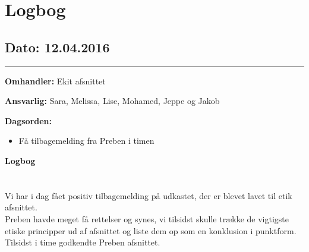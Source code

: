 \chapter{Logbog}

\section{Dato: 12.04.2016}
\hrule

\textbf{Omhandler:} Ekit afsnittet

\textbf{Ansvarlig:} Sara, Melissa, Lise, Mohamed, Jeppe og Jakob

\textbf{Dagsorden:}
\begin{itemize}
	\item Få tilbagemelding fra Preben i timen
\end{itemize}

\textbf{Logbog}
\\
\\ \\
Vi har i dag fået positiv tilbagemelding på udkastet, der er blevet lavet til etik afsnittet. \\
Preben havde meget få rettelser og synes, vi tilsidst skulle trække de vigtigste etiske principper ud af afsnittet og liste dem op som en konklusion i punktform. \\
Tilsidst i time godkendte Preben afsnittet. 



